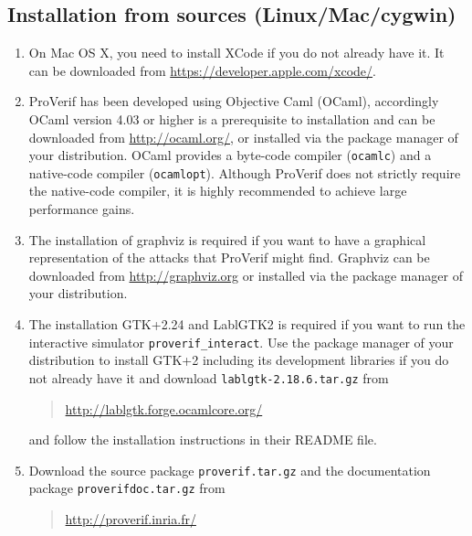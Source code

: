 \documentclass{book}
\begin{document}
\subsection{Installation from sources (Linux/Mac/cygwin)}

\begin{enumerate}

\item On Mac OS X, you need to install XCode if you do not
already have it. It can be downloaded from \url{https://developer.apple.com/xcode/}.

\item ProVerif has been developed using Objective Caml (OCaml), accordingly OCaml version 4.03 or higher is a prerequisite to installation and can be downloaded from \url{http://ocaml.org/}, or installed via the package manager of your distribution. OCaml provides a byte-code compiler (\texttt{ocamlc}) and a native-code compiler (\texttt{ocamlopt}). Although ProVerif does not strictly require the native-code compiler, it is highly recommended to achieve large performance gains.

\item The installation of graphviz is required if you want to have a graphical representation of the attacks that ProVerif might find. Graphviz can be downloaded from \url{http://graphviz.org} or installed via the package manager of your distribution.

\item The installation GTK+2.24 and LablGTK2 is required if you want to
run the interactive simulator \texttt{proverif\_interact}. Use the
package manager of your distribution to install GTK+2 including its
development libraries if you do not already have it and
download \texttt{lablgtk-2.18.6.tar.gz} from
\begin{quote}
	\url{http://lablgtk.forge.ocamlcore.org/}
\end{quote}
and follow the installation instructions in their README file.

\sloppy

\item Download the source package \texttt{proverif\V.tar.gz} and the documentation
package \texttt{proverifdoc\V.tar.gz}
from
\begin{quote}
	\url{http://proverif.inria.fr/}
\end{quote}

\fussy


\end{enumerate}
\end{document}
